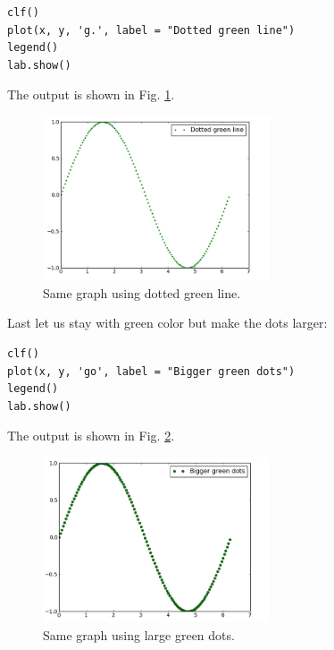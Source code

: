 \begin{verbatim}
clf()
plot(x, y, 'g.', label = "Dotted green line")
legend()
lab.show()
\end{verbatim}
The output is shown in Fig. \ref{fig:plot4}.

\begin{figure}[!ht]
\begin{center}
\includegraphics[width=0.6\textwidth]{imgp/plot4.png}
\end{center}
\vspace{-6mm}
\caption{Same graph using dotted green line.}
\label{fig:plot4}
\end{figure}
\noindent
\noindent
Last let us stay with green color but make the dots larger:

\begin{verbatim}
clf()
plot(x, y, 'go', label = "Bigger green dots")
legend()
lab.show()
\end{verbatim}
\noindent
The output is shown in Fig. \ref{fig:plot5}.
\newpage

\begin{figure}[!ht]
\begin{center}
\includegraphics[width=0.6\textwidth]{imgp/plot5.png}
\end{center}
\vspace{-6mm}
\caption{Same graph using large green dots.}
\label{fig:plot5}
\end{figure}
\noindent

